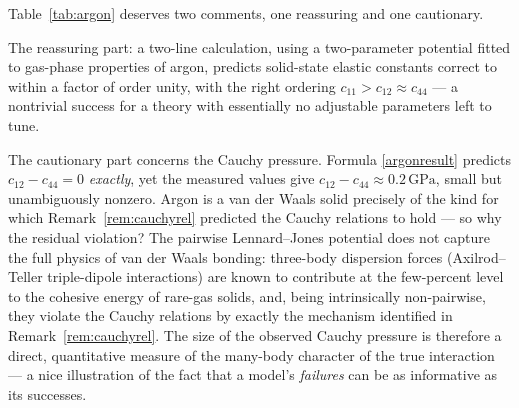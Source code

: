 \begin{remark}
	Table~\ref{tab:argon} deserves two comments, one reassuring and one cautionary.

	The reassuring part: a two-line calculation, using a two-parameter potential fitted to gas-phase properties of argon, predicts solid-state elastic constants correct to within a factor of order unity, with the right ordering $c_{11}>c_{12}\approx c_{44}$ --- a nontrivial success for a theory with essentially no adjustable parameters left to tune.

	The cautionary part concerns the Cauchy pressure. Formula \eqref{argonresult} predicts $c_{12}-c_{44}=0$ \textit{exactly}, yet the measured values give $c_{12}-c_{44}\approx0.2\,\mathrm{GPa}$, small but unambiguously nonzero. Argon is a van der Waals solid precisely of the kind for which Remark~\ref{rem:cauchyrel} predicted the Cauchy relations to hold --- so why the residual violation? The pairwise Lennard--Jones potential does not capture the full physics of van der Waals bonding: three-body dispersion forces (Axilrod--Teller triple-dipole interactions) are known to contribute at the few-percent level to the cohesive energy of rare-gas solids, and, being intrinsically non-pairwise, they violate the Cauchy relations by exactly the mechanism identified in Remark~\ref{rem:cauchyrel}. The size of the observed Cauchy pressure is therefore a direct, quantitative measure of the many-body character of the true interaction --- a nice illustration of the fact that a model's \textit{failures} can be as informative as its successes.
\end{remark}

